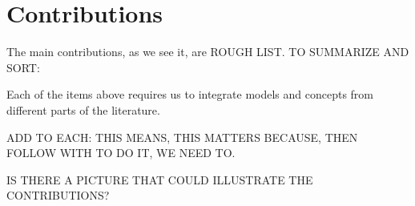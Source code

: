 \section{Contributions}
The main contributions, %
as we see it, are ROUGH LIST. TO SUMMARIZE AND SORT:


Each of the items above requires us to  integrate models and concepts from different parts of the literature. 

ADD TO EACH: THIS MEANS, THIS MATTERS BECAUSE, THEN FOLLOW WITH TO DO IT, WE NEED TO.


IS THERE A PICTURE THAT COULD ILLUSTRATE THE CONTRIBUTIONS?

